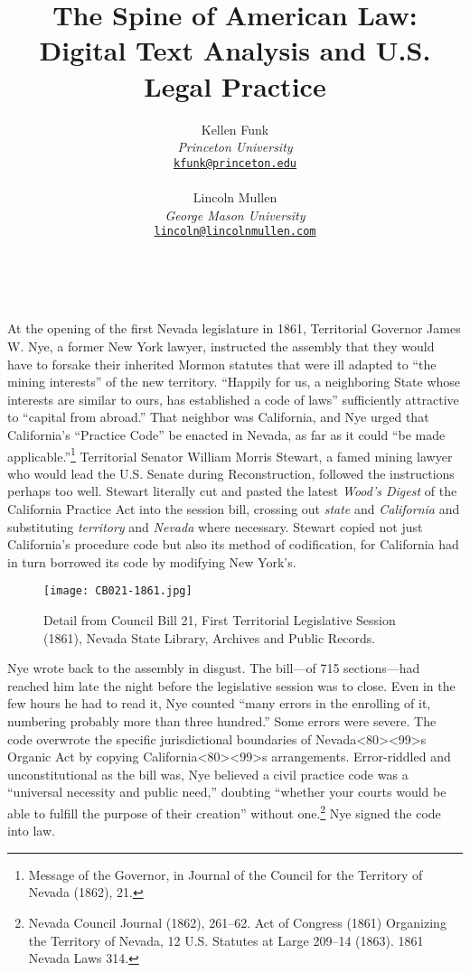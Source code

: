 \documentclass[12pt,]{article}
\title{The Spine of American Law:\\
Digital Text Analysis and U.S. Legal Practice}
\author{  \normalsize Kellen Funk \\ \small \emph{Princeton University} \\ \small \href{mailto:kfunk@princeton.edu}{\nolinkurl{kfunk@princeton.edu}}  \\ \\   \normalsize Lincoln Mullen \\ \small \emph{George Mason University} \\ \small \href{mailto:lincoln@lincolnmullen.com}{\nolinkurl{lincoln@lincolnmullen.com}} }
\date{}
\let\rmarkdownfootnote\footnote%
\def\footnote{\protect\rmarkdownfootnote}
\begin{document}
\maketitle

~

At the opening of the first Nevada legislature in 1861, Territorial
Governor James W. Nye, a former New York lawyer, instructed the assembly
that they would have to forsake their inherited Mormon statutes that
were ill adapted to ``the mining interests'' of the new territory.
``Happily for us, a neighboring State whose interests are similar to
ours, has established a code of laws'' sufficiently attractive to
``capital from abroad.'' That neighbor was California, and Nye urged
that California's ``Practice Code'' be enacted in Nevada, as far as it
could ``be made applicable.''\footnote{Message of the Governor, in
  Journal of the Council for the Territory of Nevada (1862), 21.}
Territorial Senator William Morris Stewart, a famed mining lawyer who
would lead the U.S. Senate during Reconstruction, followed the
instructions perhaps too well. Stewart literally cut and pasted the
latest \emph{Wood's Digest} of the California Practice Act into the
session bill, crossing out \emph{state} and \emph{California} and
substituting \emph{territory} and \emph{Nevada} where necessary. Stewart
copied not just California's procedure code but also its method of
codification, for California had in turn borrowed its code by modifying
New York's.

\begin{figure}
\centering
\texttt{[image: CB021-1861.jpg]}
\caption{Detail from Council Bill 21, First Territorial Legislative
Session (1861), Nevada State Library, Archives and Public Records.}
\end{figure}

Nye wrote back to the assembly in disgust. The bill---of 715
sections---had reached him late the night before the legislative session
was to close. Even in the few hours he had to read it, Nye counted
``many errors in the enrolling of it, numbering probably more than three
hundred.'' Some errors were severe. The code overwrote the specific
jurisdictional boundaries of
Nevada\textless80\textgreater\textless99\textgreater s Organic Act by
copying California\textless80\textgreater\textless99\textgreater s
arrangements. Error-riddled and unconstitutional as the bill was, Nye
believed a civil practice code was a ``universal necessity and public
need,'' doubting ``whether your courts would be able to fulfill the
purpose of their creation'' without one.\footnote{Nevada Council Journal
  (1862), 261--62. Act of Congress (1861) Organizing the Territory of
  Nevada, 12 U.S. Statutes at Large 209--14 (1863). 1861 Nevada Laws
  314.} Nye signed the code into law.
\end{document}
